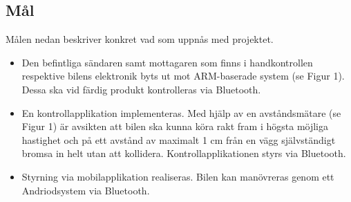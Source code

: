 \documentclass[a4paper]{article}
\begin{document}

\subsection{Mål}
Målen nedan beskriver konkret vad som uppnås med projektet.

\begin{itemize}
\item Den befintliga sändaren samt mottagaren som finns i handkontrollen respektive bilens elektronik byts ut mot ARM-baserade system (se Figur 1). Dessa ska vid färdig produkt kontrolleras via Bluetooth.
\item En kontrollapplikation implementeras. Med hjälp av en avståndsmätare (se Figur 1) är avsikten att bilen ska kunna köra rakt fram i högsta möjliga hastighet och på ett avstånd av maximalt 1 cm från en vägg självständigt bromsa in helt utan att kollidera. Kontrollapplikationen styrs via Bluetooth.
\item Styrning via mobilapplikation realiseras. Bilen kan manövreras genom ett Andriodsystem via Bluetooth.
\end{itemize}
\end{document}

